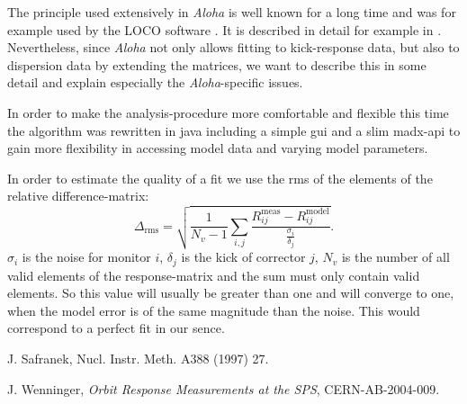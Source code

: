 \documentclass{book}
\newcommand{\fitnorm}{\ensuremath{\Delta_\mathrm{rms}}}
\newcommand{\respmatmeas}{\ensuremath{R_{ij}^\mathrm{meas}}}
\newcommand{\respmatmodel}{\ensuremath{R_{ij}^\mathrm{model}}}
\newcommand{\noise}{\sigma}
\newcommand{\kick}{\delta}
\newcommand{\aloha}{\emph{Aloha}}
\begin{document}
The principle used extensively in \aloha{} is well known for a long time and
was for example used by the LOCO software \cite{SAFRA}. It is described in
detail for example in \cite{JW-RESP-SPS}. Nevertheless, since \aloha{} not only
allows fitting to kick-response data, but also to dispersion data by extending
the matrices, we want to describe this in some detail and explain especially
the \aloha-specific issues. 


In order to make the analysis-procedure more comfortable and flexible this time the algorithm was rewritten in java including a simple gui and a slim madx-api to gain more flexibility in accessing model data and varying model parameters.

In order to estimate the quality of a fit we use the rms of the elements of the relative difference-matrix:
\begin{equation}
\label{eq:fitnorm}
	\fitnorm = \sqrt{\frac{1}{N_v - 1} \sum_{i, j} \frac{\respmatmeas - \respmatmodel}{\frac{\noise_i}{\kick_j}}}.
\end{equation}
$\noise_i$ is the noise for monitor $i$, $\kick_j$ is the kick of corrector $j$,
$N_v$ is the number of all valid elements of the response-matrix and the sum must only contain valid elements. So this value will usually be greater than one and will converge to one, when the model error is of the same magnitude than the noise. This would correspond to a perfect fit in our sence.


\begin{thebibliography}{10}

 J. Safranek, Nucl. Instr. Meth. A388 (1997) 27.

 J. Wenninger, {\it Orbit Response Measurements at the SPS},
CERN-AB-2004-009.

\end{thebibliography}
\end{document}
